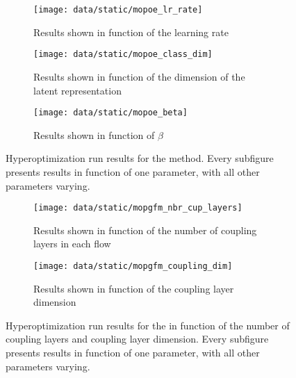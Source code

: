 \begin{figure}
    \centering
    \begin{subfigure}[b]{0.9\textwidth}
        \centering
        \texttt{[image: data/static/mopoe\_lr\_rate]}
        \caption{Results shown in function of the learning rate}
        \label{subfig:mopoe_lr_rate}
    \end{subfigure}
    \hfill
    \begin{subfigure}[b]{0.9\textwidth}
        \centering
        \texttt{[image: data/static/mopoe\_class\_dim]}
        \caption{Results shown in function of the dimension of the latent representation}
    \end{subfigure}
    \hfill
    \begin{subfigure}[b]{0.9\textwidth}
        \centering
        \texttt{[image: data/static/mopoe\_beta]}
        \caption{Results shown in function of $\beta$}
    \end{subfigure}
    \caption{Hyperoptimization run results for the  method. Every subfigure presents results in function of one parameter, with all other parameters varying.}
    \label{fig:mopoe hyperopt}
\end{figure}

\begin{figure}
    \centering
    \begin{subfigure}[b]{0.9\textwidth}
        \centering
        \texttt{[image: data/static/mopgfm\_nbr\_cup\_layers]}
        \caption{Results shown in function of the number of coupling layers in each flow}
    \end{subfigure}
    \hfill
    \begin{subfigure}[b]{0.9\textwidth}
        \centering
        \texttt{[image: data/static/mopgfm\_coupling\_dim]}
        \caption{Results shown in function of the coupling layer dimension}
    \end{subfigure}
    \caption{Hyperoptimization run results for the  in function of the number of coupling layers and coupling layer dimension. Every subfigure presents results in function of one parameter, with all other parameters varying.}
    \label{fig:mopgfm hyperopt1}
\end{figure}

